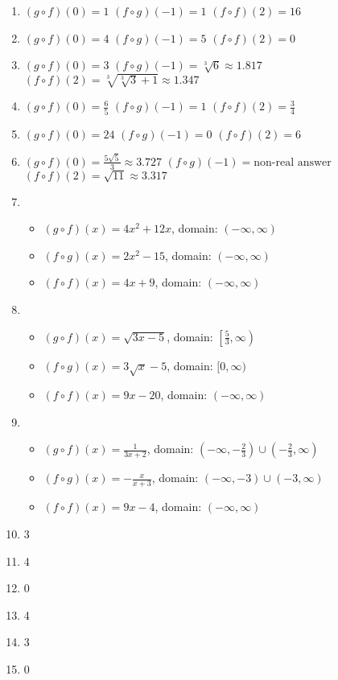 \documentclass[11pt]{article}
\begin{document}
\begin{enumerate}
    \item $(g\circ f)(0) =1$ \quad $(f \circ g)(-1) = 1$ \quad $(f \circ f)(2) = 16$
    
    \item $(g\circ f)(0) =4$ \quad $(f \circ g)(-1) = 5$ \quad $(f \circ f)(2) = 0$
    
    \item $(g\circ f)(0) =3$ \quad $(f \circ g)(-1) = \sqrt[3]{6} \approx 1.817$ \quad $(f \circ f)(2) = \sqrt[3]{\sqrt[3]{3}+1} \approx 1.347$
    
    \item $(g\circ f)(0) =\frac{6}{5}$ \quad $(f \circ g)(-1) = 1$ \quad $(f \circ f)(2) = \frac{3}{4}$
    
    \item $(g\circ f)(0) =24$ \quad $(f \circ g)(-1) = 0$ \quad $(f \circ f)(2) = 6$
    
    \item $(g\circ f)(0) = \frac{5\sqrt{5}}{3} \approx 3.727$ \quad $(f \circ g)(-1) = \text{non-real answer}$ \quad $(f \circ f)(2) = \sqrt{11} \approx 3.317$
    
    \item 
    \begin{itemize}
    \item $(g\circ f)(x) = 4x^2+12x$, domain: $(-\infty, \infty)$
    \item $(f\circ g)(x) = 2x^2-15$, domain: $(-\infty, \infty)$
    \item $(f\circ f)(x) = 4x+9$, domain: $(-\infty, \infty)$
    \end{itemize}
    
    \item 
    \begin{itemize}
    \item $(g\circ f)(x) = \sqrt{3x-5}$, domain: $\left[\frac{5}{3}, \infty \right)$
    \item $(f\circ g)(x) = 3\sqrt{x}-5$, domain: $[0, \infty)$
    \item $(f\circ f)(x) = 9x-20$, domain: $(-\infty, \infty)$
    \end{itemize}
    
    \item 
    \begin{itemize}
    \item $(g\circ f)(x) = \frac{1}{3x+2}$, domain: $\left(-\infty, -\frac{2}{3}\right) \cup \left(-\frac{2}{3}, \infty\right)$
    \item $(f\circ g)(x) = -\frac{x}{x+3}$, domain: $(-\infty, -3) \cup (-3, \infty)$
    \item $(f\circ f)(x) = 9x-4$, domain: $(-\infty, \infty)$
    \end{itemize}
    
    \item 3
    \item 4
    \item 0
    \item 4
    \item 3
    \item 0
\end{enumerate}
\end{document}
